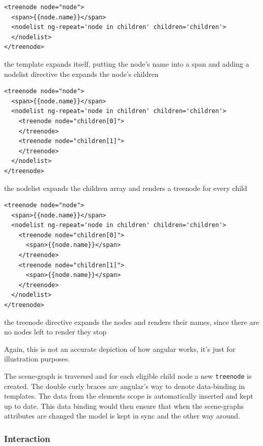 \begin{listing}[H]
  \begin{verbatim}
<treenode node="node">
  <span>{{node.name}}</span>
  <nodelist ng-repeat='node in children' children='children'>
  </nodelist>
</treenode>
  \end{verbatim}
  \caption{the template expands itself, putting the node's name into a span and adding a nodelist directive the expands the node's children}
\end{listing}

\begin{listing}[H]
  \begin{verbatim}
<treenode node="node">
  <span>{{node.name}}</span>
  <nodelist ng-repeat='node in children' children='children'>
    <treenode node="children[0]">
    </treenode>
    <treenode node="children[1]">
    </treenode>
  </nodelist>
</treenode>
  \end{verbatim}
  \caption{the nodelist expands the children array and renders a treenode for every child}
\end{listing}

\begin{listing}[H]
  \begin{verbatim}
<treenode node="node">
  <span>{{node.name}}</span>
  <nodelist ng-repeat='node in children' children='children'>
    <treenode node="children[0]">
      <span>{{node.name}}</span>
    </treenode>
    <treenode node="children[1]">
      <span>{{node.name}}</span>
    </treenode>
  </nodelist>
</treenode>
  \end{verbatim}
  \caption{the treenode directive expands the nodes and renders their names, since there are no nodes left to render they stop}
\end{listing}


Again, this is not an accurate depiction of how angular works, it's just
for illustration purposes.

The scene-graph is traversed and for each eligible child node a new
\texttt{treenode} is created. The double curly braces are angular's way
to denote data-binding in templates. The data from the elements scope is
automatically inserted and kept up to date. This data binding would then
ensure that when the scene-graphs attributes are changed the model is
kept in sync and the other way around.

\subsubsection{Interaction}\label{interaction}
